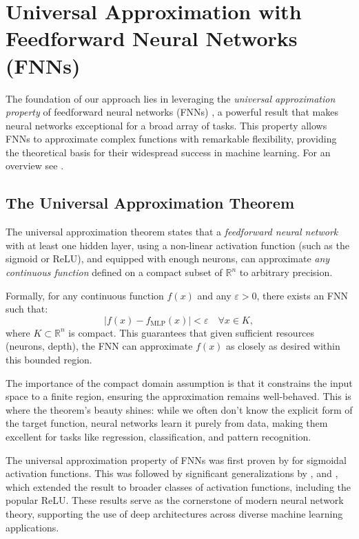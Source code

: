 \documentclass{article}
\newcounter{ct}
\begin{document}
\newpage
%




\newpage
\appendix 

\section{Universal Approximation with Feedforward Neural Networks (FNNs)}\label{sec:uniapproxffn}
The foundation of our approach lies in leveraging the \textit{universal approximation property} of feedforward neural networks (FNNs)  \citep{poggio1990networks}, a powerful result that makes neural networks exceptional for a broad array of tasks. This property allows FNNs to approximate complex functions with remarkable flexibility, providing the theoretical basis for their widespread success in machine learning.
For an overview see  \citep{blum1991approximation,scarselli1998universal,augustine2024survey}.


\subsection{The Universal Approximation Theorem}
The universal approximation theorem states that a \textit{feedforward neural network} with at least one hidden layer, using a non-linear activation function (such as the sigmoid or ReLU), and equipped with enough neurons, can approximate \textit{any continuous function} defined on a compact subset of \(\mathbb{R}^n\) to arbitrary precision.

Formally, for any continuous function \(f(x)\) and any \(\varepsilon > 0\), there exists an FNN such that:
\begin{equation}
| f(x) - f_{\text{MLP}}(x) | < \varepsilon \quad \forall x \in K,
\end{equation}
where \(K \subset \mathbb{R}^n\) is compact. This guarantees that given sufficient resources (neurons, depth), the FNN can approximate \(f(x)\) as closely as desired within this bounded region.

The importance of the compact domain assumption is that it constrains the input space to a finite region, ensuring the approximation remains well-behaved.	
This is where the theorem’s beauty shines: while we often don’t know the explicit form of the target function, neural networks learn it purely from data, making them excellent for tasks like regression, classification, and pattern recognition.

The universal approximation property of FNNs was first proven by  \citep{cybenko1989approximation} for sigmoidal activation functions. This was followed by significant generalizations by  \citep{hornik1989multilayer},  \citep{funahashi1989approximate} and  \citep{hechtnielsen1992backpropagation}, which extended the result to broader classes of activation functions, including the popular ReLU.
These results serve as the cornerstone of modern neural network theory, supporting the use of deep architectures across diverse machine learning applications.
\end{document}
